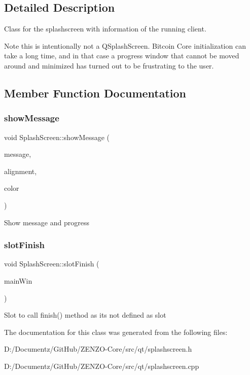 \subsection{Detailed Description}
Class for the splashscreen with information of the running client.

\begin{DoxyNote}{Note}
this is intentionally not a Q\+Splash\+Screen. Bitcoin Core initialization can take a long time, and in that case a progress window that cannot be moved around and minimized has turned out to be frustrating to the user. 
\end{DoxyNote}


\subsection{Member Function Documentation}
\mbox{\label{class_splash_screen_a16635123e7906390e0aedb7d58ba9923}} 
\subsubsection{\texorpdfstring{showMessage}{showMessage}}
{\footnotesize\ttfamily void Splash\+Screen\+::show\+Message (\begin{DoxyParamCaption}\item[{const Q\+String \&}]{message,  }\item[{int}]{alignment,  }\item[{const Q\+Color \&}]{color }\end{DoxyParamCaption})\hspace{0.3cm}{\ttfamily [slot]}}

Show message and progress \mbox{\label{class_splash_screen_ace6374d1889d704d4a41316540d9b47d}} 
\subsubsection{\texorpdfstring{slotFinish}{slotFinish}}
{\footnotesize\ttfamily void Splash\+Screen\+::slot\+Finish (\begin{DoxyParamCaption}\item[{Q\+Widget $\ast$}]{main\+Win }\end{DoxyParamCaption})\hspace{0.3cm}{\ttfamily [slot]}}

Slot to call finish() method as it\textquotesingle{}s not defined as slot 

The documentation for this class was generated from the following files\+:\begin{DoxyCompactItemize}
\item 
D\+:/\+Documentz/\+Git\+Hub/\+Z\+E\+N\+Z\+O-\/\+Core/src/qt/splashscreen.\+h\item 
D\+:/\+Documentz/\+Git\+Hub/\+Z\+E\+N\+Z\+O-\/\+Core/src/qt/splashscreen.\+cpp\end{DoxyCompactItemize}
